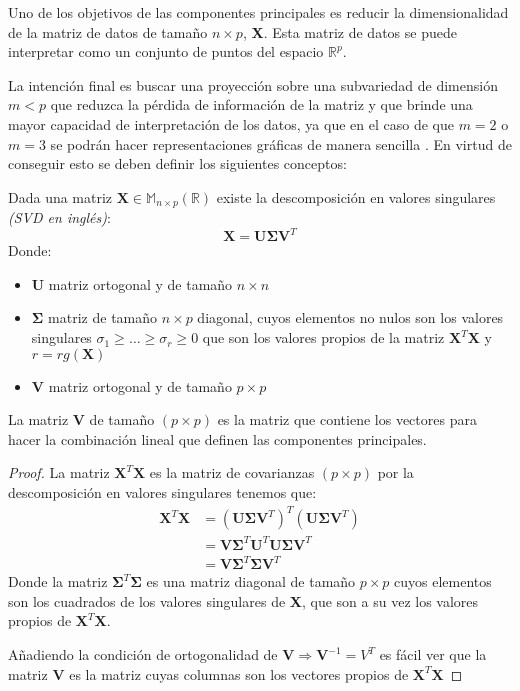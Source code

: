\noindent Uno de los objetivos de las componentes principales es reducir la dimensionalidad de la matriz de datos de tamaño $n\times p$, \textbf{X}. Esta matriz de datos se puede interpretar como un conjunto de puntos del espacio $\mathbb{R}^p$. 

\noindent La intención final es buscar una proyección sobre una subvariedad de dimensión $m<p$ que reduzca la pérdida de información de la matriz y que brinde una mayor capacidad de interpretación de los datos, ya que en el caso de que $m=2$ o $m=3$ se podrán hacer representaciones gráficas de manera sencilla . En virtud de conseguir esto se deben definir los siguientes conceptos:

\begin{defi}
Dada una matriz $\textbf{X}\in  \mathbb{M}_{n\times p}(\mathbb{R})$ existe la descomposición en valores singulares \textit{(SVD en inglés)}:
\begin{equation}
\textbf{X}=\textbf{U}\mathbf{\Sigma}\textbf{V}^T
\end{equation}
Donde:
\begin{itemize}
\item \textbf{U} matriz ortogonal y de tamaño $n \times n$
\item $\mathbf{\Sigma}$ matriz de tamaño $n \times p $ diagonal, cuyos elementos no nulos son los valores singulares $\sigma_1\geq\ldots\geq \sigma_r\geq 0$ que son los valores propios de la matriz $\textbf{X}^T\textbf{X}$ y $r=rg(\textbf{X})$
\item \textbf{V} matriz ortogonal y de tamaño $p \times p$
\end{itemize}
\end{defi}

\begin{propo}
La matriz \textbf{V} de tamaño $(p\times p)$ es la matriz que contiene los vectores para hacer la combinación lineal que definen las componentes principales.
\begin{proof}
La matriz $\textbf{X}^T \textbf{X}$ es la matriz de covarianzas $(p \times p)$  por la descomposición en valores singulares tenemos que:
\begin{align*}
\textbf{X}^T \textbf{X} &= (\textbf{U}\mathbf{\Sigma} \textbf{V}^T)^T (\textbf{U}\mathbf{\Sigma} \textbf{V}^T)\\
&= \textbf{V}\mathbf{\Sigma} ^T \textbf{U}^T \textbf{U}\mathbf{\Sigma} \textbf{V}^T\\
&= \textbf{V}\mathbf{\Sigma} ^T \mathbf{\Sigma} \textbf{V}^T
\end{align*}
Donde la matriz $\mathbf{\Sigma} ^T \mathbf{\Sigma} $ es una matriz diagonal de tamaño $p \times p $ cuyos elementos son los cuadrados de los valores singulares de \textbf{X}, que son a su vez los valores propios de $\textbf{X}^T \textbf{X}$. 

\noindent Añadiendo la condición de ortogonalidad de $\textbf{V}\Rightarrow \textbf{V}^{-1}=V^T$ es fácil ver que la matriz \textbf{V} es la matriz cuyas columnas son los vectores propios de $\textbf{X}^T\textbf{X}$
\end{proof}
\end{propo}

